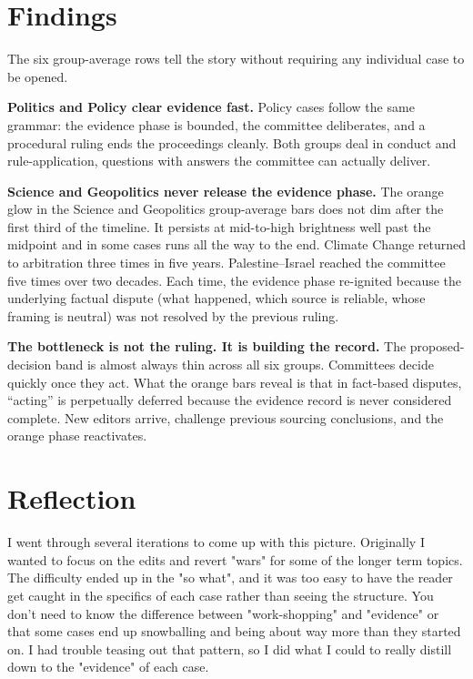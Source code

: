 \documentclass[a4paper, 11pt]{article}
\begin{document}

\section{Findings}

The six group-average rows tell the story without requiring any individual case
to be opened.

\textbf{Politics and Policy clear evidence fast.}
Policy cases follow the same grammar: the evidence phase is bounded, the
committee deliberates, and a procedural ruling ends the proceedings cleanly.
Both groups deal in conduct and rule-application, questions with answers
the committee can actually deliver.

\textbf{Science and Geopolitics never release the evidence phase.}
The orange glow in the Science and Geopolitics group-average bars does not
dim after the first third of the timeline.
It persists at mid-to-high brightness well past the midpoint and in some
cases runs all the way to the end.
Climate Change returned to arbitration three times in five years.
Palestine--Israel reached the committee five times over two decades.
Each time, the evidence phase re-ignited because the underlying factual
dispute (what happened, which source is reliable, whose framing is
neutral) was not resolved by the previous ruling.

\textbf{The bottleneck is not the ruling. It is building the record.}
The proposed-decision band is almost always thin across all six groups.
Committees decide quickly once they act.
What the orange bars reveal is that in fact-based disputes,
``acting'' is perpetually deferred because the evidence record is never
considered complete.
New editors arrive, challenge previous sourcing conclusions, and the orange
phase reactivates.



\section{Reflection}

I went through several iterations to come up with this picture. Originally I wanted to focus on the edits and revert "wars" for some of the longer term topics. The difficulty ended up in the "so what", and it was too easy to have the reader get caught in the specifics of each case rather than seeing the structure. You don't need to know the difference between "work-shopping" and "evidence" or that some cases end up snowballing and being about way more than they started on. I had trouble teasing out that pattern, so I did what I could to really distill down to the "evidence" of each case.
\end{document}
